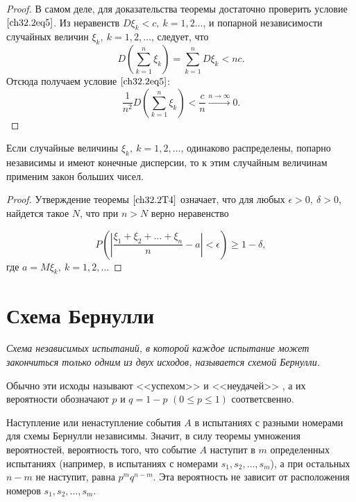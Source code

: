 \begin{proof}
В самом деле, для доказательства теоремы достаточно проверить условие $\eqref{ch32.2eq5}$. Из неравенств $D  \xi_k < c, \: k = 1, 2\ldots$, и попарной независимости случайных величин $\xi_k, \: k = 1,2,\ldots$, следует, что
$$
D  \left( \sum_{k  = 1}^{n} \xi_k\right) = \sum_{k  = 1}^{n} D  \xi_k  < nc.
$$
Отсюда получаем условие $\eqref{ch32.2eq5}$:
$$
\frac{1}{n^2} D  \left( \sum_{k  = 1}^{n} \xi_k\right) < \frac{c}{n} \xrightarrow{n \to \infty} 0.
$$
\end{proof}

\begin{thm} \label{ch32.2T4}
Если случайные величины $\xi_k, \: k = 1,2,\ldots$, одинаково распределены, попарно независимы и имеют конечные дисперсии, то к этим случайным величинам применим закон больших чисел.
\end{thm}

\begin{proof}
Утверждение теоремы $\ref{ch32.2T4}$ означает, что для любых $\epsilon > 0, \: \delta > 0$, найдется такое $N$, что при $n > N$ верно неравенство

\begin{equation} \label{ch32.2eq6}
P \left( \left| \frac{\xi_1 + \xi_2 + \ldots + \xi_n}{n} - a \right| < \epsilon \right) \ge 1 - \delta,
\end{equation}
где $a = M  \xi_k, \: k = 1, 2, \ldots$
\end{proof}

\section{Схема Бернулли}

\textit{Схема независимых испытаний, в которой каждое испытание может закончиться только одним из двух исходов, называется схемой Бернулли.}

Обычно эти исходы называют <<успехом>> и <<неудачей>> , а их вероятности обозначают $p$ и $q = 1 - p$ $(0 \le p \le 1)$ соответсвенно.

Наступление или ненаступление события $A$ в испытаниях с разными номерами для схемы Бернулли независимы. Значит, в силу теоремы умножения вероятностей, вероятность того, что событие $A$ наступит в $m$ определенных испытаниях (например, в испытаниях с номерами $s_1, s_2, \ldots, s_m$), а при остальных $n - m$ не наступит, равна $p^mq^{n - m}$. Эта вероятность не зависит от  расположения номеров $s_1, s_2, \ldots, s_m$.

